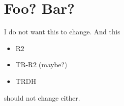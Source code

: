 \section{Foo?
  Bar?
 }

I do not want this to change.
And this
\begin{itemize}
	\item R2
	\item TR-R2 (maybe?)
	\item TRDH
\end{itemize}
should not change either.
